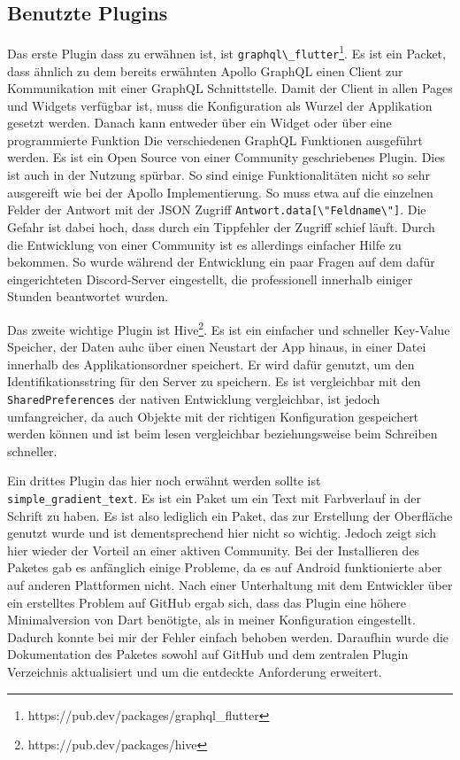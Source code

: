 \subsection{Benutzte Plugins}
Das erste Plugin dass zu erwähnen ist, ist \verb|graphql\_flutter|\footnote{https://pub.dev/packages/graphql\_flutter}. Es ist ein Packet, dass ähnlich zu dem bereits erwähnten Apollo GraphQL einen Client zur Kommunikation mit einer GraphQL Schnittstelle. Damit der Client in allen Pages und Widgets verfügbar ist, muss die Konfiguration als Wurzel der Applikation gesetzt werden. Danach kann entweder über ein Widget oder über eine programmierte Funktion Die verschiedenen GraphQL Funktionen ausgeführt werden. Es ist ein Open Source von einer Community geschriebenes Plugin. Dies ist auch in der Nutzung spürbar. So sind einige Funktionalitäten nicht so sehr ausgereift wie bei der Apollo Implementierung. So muss etwa auf die einzelnen Felder der Antwort mit der JSON Zugriff \verb|Antwort.data[\"Feldname\"]|. Die Gefahr ist dabei hoch, dass durch ein Tippfehler der Zugriff schief läuft. Durch die Entwicklung von einer Community ist es allerdings einfacher Hilfe zu bekommen. So wurde während der Entwicklung ein paar Fragen auf dem dafür eingerichteten Discord-Server eingestellt, die professionell innerhalb einiger Stunden beantwortet wurden.

Das zweite wichtige Plugin ist Hive\footnote{https://pub.dev/packages/hive}. Es ist ein einfacher und schneller Key-Value Speicher, der Daten auhc über einen Neustart der App hinaus, in einer Datei innerhalb des Applikationsordner speichert. Er wird dafür genutzt, um den Identifikationsstring für den Server zu speichern. Es ist vergleichbar mit den \verb|SharedPreferences| der nativen Entwicklung vergleichbar, ist jedoch umfangreicher, da auch Objekte mit der richtigen Konfiguration gespeichert werden können und ist beim lesen vergleichbar beziehungsweise beim Schreiben schneller.

Ein drittes Plugin das hier noch erwähnt werden sollte ist \verb|simple_gradient_text|. Es ist ein Paket um ein Text mit Farbverlauf in der Schrift zu haben. Es ist also lediglich ein Paket, das zur Erstellung der Oberfläche genutzt wurde und ist dementsprechend hier nicht so wichtig. Jedoch zeigt sich hier wieder der Vorteil an einer aktiven Community. Bei der Installieren des Paketes gab es anfänglich einige Probleme, da es auf Android funktionierte aber auf anderen Plattformen nicht. Nach einer Unterhaltung mit dem Entwickler über ein erstelltes Problem auf GitHub ergab sich, dass das Plugin eine höhere Minimalversion von Dart benötigte, als in meiner Konfiguration eingestellt. Dadurch konnte bei mir der Fehler einfach behoben werden. Daraufhin wurde die Dokumentation des Paketes sowohl auf GitHub und dem zentralen Plugin Verzeichnis aktualisiert und um die entdeckte Anforderung erweitert.

